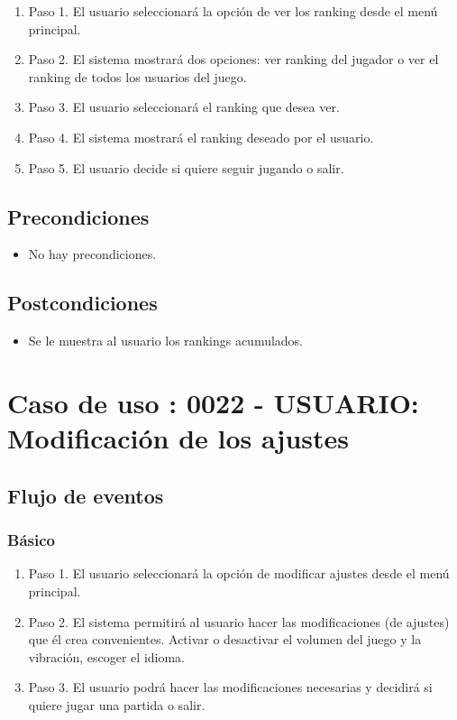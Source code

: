 \begin{enumerate}
\item Paso 1.
El usuario seleccionará la opción de ver los ranking desde el menú principal. 
\item Paso 2.
El sistema mostrará dos opciones: ver ranking del jugador o ver el ranking de todos los usuarios del juego.
\item Paso 3.
El usuario seleccionará el ranking que desea ver.
\item Paso 4.
El sistema mostrará el ranking deseado por el usuario.
\item Paso 5.
El usuario decide si quiere seguir jugando o salir.
\end{enumerate}

\subsection{Precondiciones}
\begin{itemize}
\item No hay precondiciones.
\end{itemize}

\subsection{Postcondiciones}
\begin{itemize}
\item Se le muestra al usuario los rankings acumulados. 
\end{itemize}



\section{Caso de uso : 0022 - USUARIO: Modificación de los ajustes}\label{sec:uc0}
\subsection{Flujo de eventos}
\subsubsection{Básico}

\begin{enumerate}
\item Paso 1.
El usuario seleccionará la opción de modificar ajustes desde el menú principal. 
\item Paso 2.
El sistema permitirá al usuario hacer las modificaciones (de ajustes) que él crea convenientes. Activar o desactivar el volumen del juego y la vibración, escoger el idioma.
\item Paso 3.
El usuario podrá hacer las modificaciones necesarias y decidirá si quiere jugar una partida o salir.
\end{enumerate}

